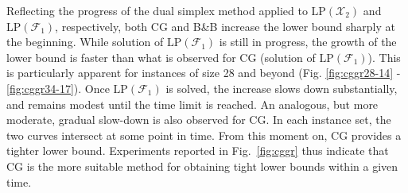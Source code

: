 Reflecting the progress of the dual simplex method applied to $\text{LP}(\mathcal{X}_2)$ and $\text{LP}(\mathcal{F}_1)$, respectively,
both CG and B\&B increase the lower bound sharply at the beginning. 
While solution of $\text{LP}(\mathcal{F}_1)$ is still in progress, the growth of the lower bound is faster than what is observed for CG (solution of $\text{LP}(\mathcal{F}_1)$). 
This is particularly apparent for instances of size 28 and beyond (Fig. \ref{fig:cggr28-14} - \ref{fig:cggr34-17}). %
Once $\text{LP}(\mathcal{F}_1)$ is solved, the increase slows down substantially, and remains modest until the time limit is reached. 
An analogous, but more moderate, gradual slow-down is also observed for CG.
In each instance set, the two curves intersect at some point in time.
From this moment on, CG provides a tighter lower bound.
Experiments reported in Fig.\ \ref{fig:cggr} thus indicate that CG is the more suitable method for obtaining tight lower bounds within a given time.
